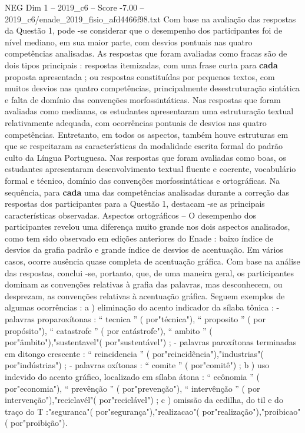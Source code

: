 \begin{textsample}{NEG Dim 1 – 2019\_c6 – Score -7.00 – 2019\_c6/enade\_2019\_fisio\_afd4466f98.txt}
Com base na avaliação das respostas da Questão 1, pode -se considerar que o desempenho dos participantes foi de nível mediano, em sua maior parte, com desvios pontuais nas quatro competências analisadas.
As respostas que foram avaliadas como fracas são de dois tipos principais : respostas itemizadas, com uma frase curta para \textbf{cada} proposta apresentada ; ou respostas constituídas por pequenos textos, com muitos desvios nas quatro competências, principalmente desestruturação sintática e falta de domínio das convenções morfossintáticas.
Nas respostas que foram avaliadas como medianas, os estudantes apresentaram uma estruturação textual relativamente adequada, com ocorrências pontuais de desvios nas quatro competências.
Entretanto, em todos os aspectos, também houve estruturas em que se respeitaram as características da modalidade escrita formal do padrão culto da Língua Portuguesa.
Nas respostas que foram avaliadas como boas, os estudantes apresentaram desenvolvimento textual fluente e coerente, vocabulário formal e técnico, domínio das convenções morfossintáticas e ortográficas.
Na sequência, para \textbf{cada} uma das competências analisadas durante a correção das respostas dos participantes para a Questão 1, destacam -se as principais características observadas.
Aspectos ortográficos – O desempenho dos participantes revelou uma diferença muito grande nos dois aspectos analisados, como tem sido observado em edições anteriores do Enade : baixo índice de desvios da grafia padrão e grande índice de desvios de acentuação.
Em vários casos, ocorre ausência quase completa de acentuação gráfica.
Com base na análise das respostas, conclui -se, portanto, que, de uma maneira geral, os participantes dominam as convenções relativas à grafia das palavras, mas desconhecem, ou desprezam, as convenções relativas à acentuação gráfica.
Seguem exemplos de algumas ocorrências : a ) eliminação do acento indicador da sílaba tônica : - palavras proparoxítonas : “ tecnica ” ( por"técnica"), “ proposito ” ( por propósito"), “ catastrofe ” ( por catástrofe"), “ ambito ” ( por"âmbito"),"sustentavel"( por"sustentável") ; - palavras paroxítonas terminadas em ditongo crescente : “ reincidencia ” ( por"reincidência"),"industrias"( por"indústrias") ; - palavras oxítonas : “ comite ” ( por"comitê") ; b ) uso indevido do acento gráfico, localizado em sílaba átona : “ ecônomia ” ( por"economia"), “ prevênção ” ( por"prevenção"), “ intervênção ” ( por intervenção"),"reciclavél"( por"reciclável") ; c ) omissão da cedilha, do til e do traço do T :"seguranca"( por"segurança"),"realizacao"( por"realização"),"proibicao"( por"proibição").

\end{textsample}
